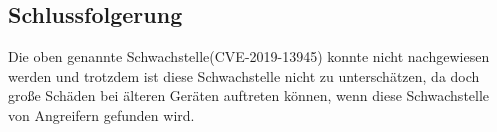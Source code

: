 


\subsection{Schlussfolgerung}

Die oben genannte Schwachstelle(CVE-2019-13945) konnte nicht nachgewiesen werden und trotzdem ist diese Schwachstelle nicht zu unterschätzen, da doch große Schäden bei älteren Geräten auftreten können, wenn diese Schwachstelle von Angreifern gefunden wird.










